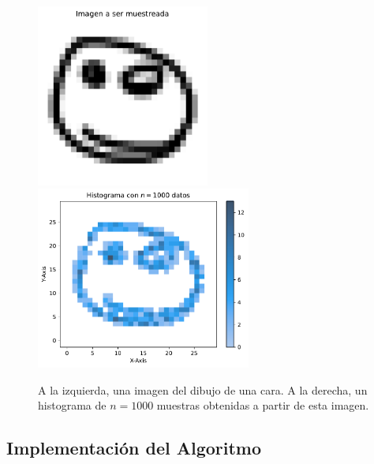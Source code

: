 \begin{figure}[htbp]
    \centering
    \includegraphics[height=6cm]{img/distr_draw/face_distrib.pdf}
    \hspace{2cm}
    \includegraphics[height=6cm]{img/distr_draw/face_hist.pdf}
    \caption{A la izquierda, una imagen del dibujo de una cara. A la derecha, un histograma de $n=1000$ muestras obtenidas a partir de esta imagen.}
    \label{fig:face-example}
\end{figure}

\subsection{Implementación del Algoritmo}\label{ssec:implementacion-algoritmo}  %

